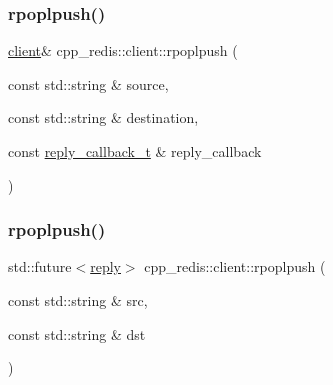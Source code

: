 \mbox{\label{classcpp__redis_1_1client_a1d50b5d26753768d79ebbe04f3615c7a}} 
\subsubsection{\texorpdfstring{rpoplpush()}{rpoplpush()}\hspace{0.1cm}{\footnotesize\ttfamily [1/2]}}
{\footnotesize\ttfamily \hyperlink{classcpp__redis_1_1client}{client}\& cpp\+\_\+redis\+::client\+::rpoplpush (\begin{DoxyParamCaption}\item[{const std\+::string \&}]{source,  }\item[{const std\+::string \&}]{destination,  }\item[{const \hyperlink{classcpp__redis_1_1client_a061a1140d36d2eaeda82b09a0bb3f9f2}{reply\+\_\+callback\+\_\+t} \&}]{reply\+\_\+callback }\end{DoxyParamCaption})}

\mbox{\label{classcpp__redis_1_1client_a4c4fd3342f665a4d902b42b051797e51}} 
\subsubsection{\texorpdfstring{rpoplpush()}{rpoplpush()}\hspace{0.1cm}{\footnotesize\ttfamily [2/2]}}
{\footnotesize\ttfamily std\+::future$<$\hyperlink{classcpp__redis_1_1reply}{reply}$>$ cpp\+\_\+redis\+::client\+::rpoplpush (\begin{DoxyParamCaption}\item[{const std\+::string \&}]{src,  }\item[{const std\+::string \&}]{dst }\end{DoxyParamCaption})}

\mbox{\label{classcpp__redis_1_1client_a925a0b8ae7864783d9e164776ca07075}} 
